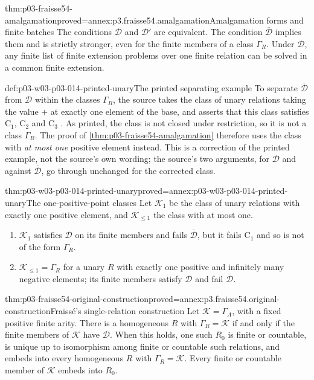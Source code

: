 \begin{hblemma}{thm:p03-fraisse54-amalgamation}{proved=annex:p3.fraisse54.amalgamation}{Amalgamation forms and finite batches}
The conditions \(\mathcal D\) and \(\mathcal D'\) are equivalent.
The condition \(\overline{\mathcal D}\) implies them and is strictly
stronger, even for the finite members of a class \(\Gamma_R\).
Under \(\mathcal D\), any finite list of finite extension problems over
one finite relation can be solved in a common finite extension.
\end{hblemma}

\begin{hbwarning}{def:p03-w03-p03-014-printed-unary}{The printed separating example}
To separate \(\overline{\mathcal D}\) from \(\mathcal D\) within the
classes \(\Gamma_R\), the source takes the class of unary relations
taking the value \(+\) at exactly one element of the base, and asserts
that this class satisfies \(\mathrm C_1\), \(\mathrm C_2\) and
\(\mathrm C_3\) \cite[\S7.3, p.~382]{Fraisse1954}. As printed, the class
is not closed under restriction, so it is not a class \(\Gamma_R\).
The proof of \cref{thm:p03-fraisse54-amalgamation} therefore uses the
class with \emph{at most one} positive element instead. This is a
correction of the printed example, not the source's own wording; the
source's two arguments, for \(\mathcal D\) and against
\(\overline{\mathcal D}\), go through unchanged for the corrected class.
\end{hbwarning}

\begin{hbtheorem}{thm:p03-w03-p03-014-printed-unary}{proved=annex:p03-w03-p03-014-printed-unary}{The one-positive-point classes}
Let \(\mathcal K_1\) be the class of unary relations with exactly one
positive element, and \(\mathcal K_{\leq1}\) the class with at most one.
\begin{enumerate}
\item \(\mathcal K_1\) satisfies \(\mathcal D\) on its finite members
      and fails \(\overline{\mathcal D}\), but it fails \(\mathrm C_1\)
      and so is not of the form \(\Gamma_R\).
\item \(\mathcal K_{\leq1}=\Gamma_R\) for a unary \(R\) with exactly
      one positive and infinitely many negative elements; its finite
      members satisfy \(\mathcal D\) and fail \(\overline{\mathcal D}\).
\end{enumerate}
\end{hbtheorem}

\begin{hbtheorem}{thm:p03-fraisse54-original-construction}{proved=annex:p3.fraisse54.original-construction}{Fra\"iss\'e's single-relation construction}
Let \(\mathcal K=\Gamma_A\), with a fixed positive finite arity.
There is a homogeneous \(R\) with \(\Gamma_R=\mathcal K\) if and only
if the finite members of \(\mathcal K\) have \(\mathcal D\).
When this holds, one such \(R_0\) is finite or countable, is unique up to
isomorphism among finite or countable such relations, and embeds into every
homogeneous \(R\) with \(\Gamma_R=\mathcal K\).
Every finite or countable member of \(\mathcal K\) embeds into \(R_0\).
\end{hbtheorem}

